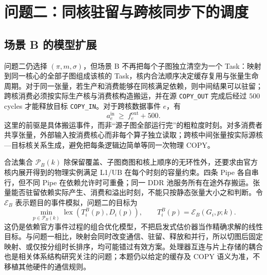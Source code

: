 \section{问题二：同核驻留与跨核同步下的调度}
\subsection{场景 B 的模型扩展}
问题二仍选择 $(\pi,m,\sigma)$，但场景 B 不再把每个子图独立清空为一个 Task：映射到同一核心的全部子图组成该核的 Task，核内合法顺序决定缓存复用与张量生命周期。对于同一张量，若生产和消费能够在同核满足依赖，则中间结果可以驻留；跨核消费必须按实际生产核与消费核构造搬运，并在源 \texttt{COPY\_OUT} 完成后经过 $500$ cycles 才能释放目标 \texttt{COPY\_IN}。对于跨核数据事件 $e$，有
\begin{equation}\label{eq:q2-release}
a_e^{\mathrm{in}}\ \ge\ f_e^{\mathrm{out}}+500.
\end{equation}
这里的前驱是具体搬运事件，而非“源子图全部运行完”的粗粒度时刻。对多消费者共享张量，外部输入按消费核心而非每个算子独立读取；跨核中间张量按实际源核—目标核关系生成，避免把每条逻辑边简单等同一次物理 COPY。

合法集合 $\mathcal P_B(k)$ 除保留覆盖、子图商图和核上顺序的无环性外，还要求由官方核内展开得到的物理实例满足 L1/UB 在每个时刻的容量约束。四条 Pipe 各自串行，但不同 Pipe 在依赖允许时可重叠；同一 DDR 池服务所有在途外存搬运。张量能否驻留依赖实际产生、消费和溢出时刻，不能只按静态张量大小之和判断。令 $\mathcal E_B$ 表示题目的事件模拟，问题二的目标为
\begin{equation}\label{eq:q2-objective}
\min_{p\in\mathcal P_B(k)}
\operatorname{lex}\left(T_i^B(p),D_i(p)\right),\qquad
T_i^B(p)=\mathcal E_B(G_i,p;k).
\end{equation}
这仍是依赖官方事件过程的组合优化模型，不把启发式估价器当作精确求解的线性目标。与问题一相比，映射会同时改变通信、驻留、释放和并行，所以切图后固定映射、或仅按分组时长排序，均可能错过有效方案。处理器互连与片上存储的耦合也是相关体系结构研究关注的问题\cite{t10}；本题仍以给定的缓存及 COPY 语义为准，不移植其他硬件的通信规则。



